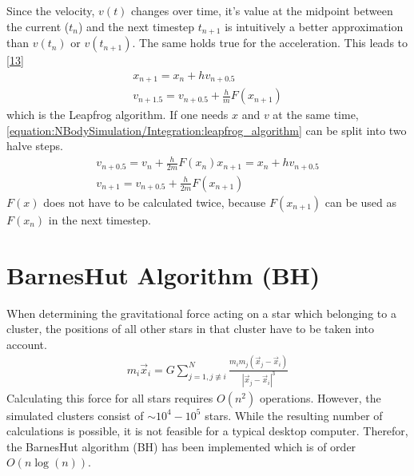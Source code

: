\documentclass[letterpaper,10pt,english]{sphinxmanual}
\begin{document}
\sphinxAtStartPar
Since the velocity, \(v(t)\) changes over time, it’s value at the midpoint between the current (\(t_n\)) and the next timestep \(t_{n+1}\) is intuitively a better approximation than
\(v(t_n)\) or \(v(t_{n+1})\). The same holds true for the acceleration. This leads to {[}\hyperlink{cite.NBodySimulation/Appendix:id27}{13}{]}
\begin{equation}\label{equation:NBodySimulation/Integration:leapfrog_algorithm}
\begin{split}x_{n+1} = x_{n} + hv_{n+0.5}\\
v_{n+1.5} = v_{n+0.5} + \frac{h}{m}F(x_{n+1})\end{split}
\end{equation}
\sphinxAtStartPar
which is the Leapfrog algorithm. If one needs \(x\) and \(v\) at the same time, \eqref{equation:NBodySimulation/Integration:leapfrog_algorithm} can be split into two halve steps.
\begin{equation*}
\begin{split}v_{n+0.5} = v_{n} + \frac{h}{2m}F(x_{n})
x_{n+1} = x_{n} + hv_{n+0.5}\\
v_{n+1} = v_{n+0.5} + \frac{h}{2m}F(x_{n+1})\end{split}
\end{equation*}
\sphinxAtStartPar
\(F(x)\) does not have to be calculated twice, because \(F(x_{n+1})\) can be used as \(F(x_{n})\) in the next timestep.


\section{Barnes\sphinxhyphen{}Hut Algorithm (BH)}
\label{\detokenize{NBodySimulation/Integration:barnes-hut-algorithm-bh}}
\sphinxAtStartPar
When determining the gravitational force acting on a star which belonging to a cluster, the positions of all other stars in that cluster
have to be taken into account.
\begin{equation*}
\begin{split}m_i\vec{x}_i = G\sum_{j=1,j\not\equiv i}^{N}\frac{m_im_j\left ( \vec{x}_j-\vec{x}_i \right )}{\left | \vec{x}_j-\vec{x}_i \right |^3}\end{split}
\end{equation*}
\sphinxAtStartPar
Calculating this force for all stars requires \(O(n^2)\) operations.
However, the simulated clusters consist of \(\sim 10^4 - 10^5\) stars.
While the resulting number of calculations is possible, it is not feasible for a typical desktop computer.
Therefor, the Barnes\sphinxhyphen{}Hut algorithm (BH) has been implemented which is of order \(O(n\log(n))\).
\end{document}
